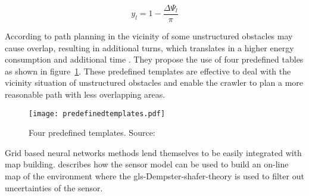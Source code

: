 \begin{equation}
    \label{eq:movementfucntion}
    y_l = 1 - \frac{\Delta \varPsi_l}{\pi}
\end{equation}

According to \citet{yan_complete_2012} path planning in the vicinity of some unstructured obstacles may cause overlap,
resulting in additional turns, which translates in a higher energy consumption and additional time
\cite{lee_smooth_2011}\cite{algabri_comparative_2015}\cite{mei_energy-efficient_2004}. They propose the use of four
predefined tables as shown in figure~\ref{fig:fourtemp}. These predefined templates are effective to deal with the
vicinity situation of unstructured obstacles and enable the crawler to plan a more reasonable path with less
overlapping areas.

\begin{figure}
    \begin{center}
        \texttt{[image: predefinedtemplates.pdf]}
    \end{center}
    \caption{Four predefined templates. Source: \citet{yan_complete_2012}}\label{fig:fourtemp}
\end{figure}

Grid based neural networks methods lend themselves to be easily integrated with map building. 
\citet{yan_complete_2012} describes how the sensor model can be used to build an on-line map of the environment where
the \gls{gls-Dempster-shafer-theory} is used to filter out uncertainties of the sensor.
\clearpage